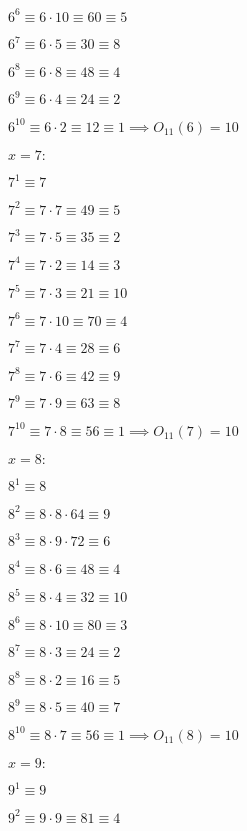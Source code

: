 \documentclass[12pt]{amsart}
\begin{document}
$6^6 \equiv 6\cdot 10 \equiv 60 \equiv 5$

$6^7 \equiv 6\cdot 5 \equiv 30 \equiv 8$

$6^8 \equiv 6\cdot 8 \equiv 48 \equiv 4$

$6^9 \equiv 6\cdot 4 \equiv 24 \equiv 2$

$6^{10} \equiv 6\cdot 2 \equiv 12 \equiv 1 \implies O_{11}(6)=10$

\medskip

$x=7:$

\smallskip

$7^1 \equiv 7$

$7^2 \equiv 7\cdot 7 \equiv 49 \equiv 5$

$7^3 \equiv 7\cdot 5 \equiv 35 \equiv 2$

$7^4 \equiv 7\cdot 2 \equiv 14 \equiv 3$

$7^5 \equiv 7\cdot 3 \equiv 21 \equiv 10$

$7^6 \equiv 7\cdot 10 \equiv 70 \equiv 4$

$7^7 \equiv 7\cdot 4 \equiv 28 \equiv 6$

$7^8 \equiv 7\cdot 6 \equiv 42 \equiv 9$

$7^9 \equiv 7\cdot 9 \equiv 63 \equiv 8$

$7^{10} \equiv 7\cdot 8 \equiv 56 \equiv 1 \implies O_{11}(7) = 10$

\medskip

$x=8:$

\smallskip

$8^1 \equiv 8$

$8^2 \equiv 8\cdot 8 \cdot 64 \equiv 9$

$8^3 \equiv 8\cdot 9 \cdot 72 \equiv 6$

$8^4 \equiv 8\cdot 6 \equiv 48 \equiv 4$

$8^5 \equiv 8 \cdot 4 \equiv 32 \equiv 10$

$8^6 \equiv 8\cdot 10 \equiv 80 \equiv 3$

$8^7 \equiv 8\cdot 3\equiv 24 \equiv 2$

$8^8 \equiv 8\cdot 2 \equiv 16 \equiv 5$

$8^9 \equiv 8\cdot 5 \equiv 40 \equiv 7$

$8^{10} \equiv 8\cdot 7 \equiv 56 \equiv 1 \implies O_{11}(8) = 10$

\medskip

$x=9:$

\smallskip

$9^1 \equiv 9$

$9^2 \equiv 9\cdot 9 \equiv 81 \equiv 4$
\end{document}
